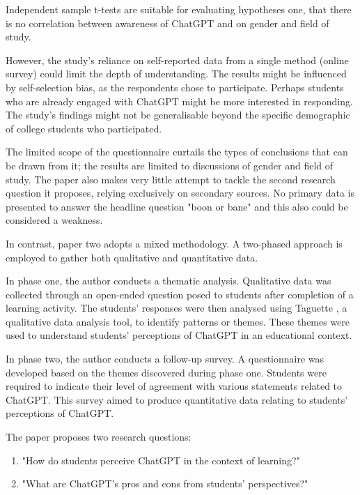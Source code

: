 \documentclass[12pt]{article}
\begin{document}
Independent sample t-tests are suitable for evaluating hypotheses one, that there is no correlation between awareness of ChatGPT and on gender and field of study. \cite{kim2019-wu}

However, the study's reliance on self-reported data from a single method (online survey) could limit the depth of understanding. The results might be influenced by self-selection bias, as the respondents chose to participate. Perhaps students who are already engaged with ChatGPT might be more interested in responding. The study's findings might not be generalisable beyond the specific demographic of college students who participated.

The limited scope of the questionnaire curtails the types of conclusions that can be drawn from it; the results are limited to discussions of gender and field of study. The paper also makes very little attempt to tackle the second research question it proposes, relying exclusively on secondary sources. No primary data is presented to answer the headline question "boon or bane" and this also could be considered a weakness.

In contrast, paper two adopts a mixed methodology. A two-phased approach is employed to gather both qualitative and quantitative data.

In phase one, the author conducts a thematic analysis. Qualitative data was collected through an open-ended question posed to students after completion of a learning activity. The students' responses were then analysed using Taguette \cite{taguette}, a qualitative data analysis tool, to identify patterns or themes. These themes were used to understand students' perceptions of ChatGPT in an educational context.

In phase two, the author conducts a follow-up survey. A questionnaire was developed based on the themes discovered during phase one. Students were required to indicate their level of agreement with various statements related to ChatGPT. This survey aimed to produce quantitative data relating to students' perceptions of ChatGPT.

The paper proposes two research questions:

\begin{enumerate}
    \item "How do students perceive ChatGPT in the context of learning?"
    \item "What are ChatGPT's pros and cons from students' perspectives?" \cite{paper2}
\end{enumerate}
\end{document}
